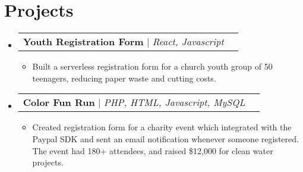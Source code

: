 \documentclass[letterpaper,11pt]{article}
\makeatletter
\newcommand{\resumeItem}[1]{
  \item\small{
    {#1 \vspace{-2pt}}
  }
}
\newcommand{\resumeProjectHeading}[2]{
    \item
    \begin{tabular*}{0.97\textwidth}{l@{\extracolsep{\fill}}r}
      \small#1 & #2 \\
    \end{tabular*}\vspace{-7pt}
}
\newcommand{\resumeSubHeadingListStart}{\begin{itemize}[leftmargin=0.0in, label={}]}
\newcommand{\resumeSubHeadingListEnd}{\end{itemize}}
\newcommand{\resumeItemListStart}{\begin{itemize}}
\newcommand{\resumeItemListEnd}{\end{itemize}\vspace{-10pt}}
\makeatother
\begin{document}
\section{Projects}
    \resumeSubHeadingListStart
        \resumeProjectHeading
          {\textbf{Youth Registration Form} $|$ \emph{React, Javascript}}{}
          \resumeItemListStart[leftmargin=0.15in]
            \resumeItem{ Built a serverless registration form for a church youth group of 50 teenagers, reducing paper waste and cutting costs.}
          \resumeItemListEnd
        \resumeProjectHeading
          {\textbf{Color Fun Run} $|$ \emph{PHP, HTML, Javascript, MySQL}}{}
          \resumeItemListStart[leftmargin=0.15in]
            \resumeItem{ Created registration form for a charity event which integrated with the Paypal SDK and sent an email notification whenever someone registered. The event had 180+ attendees, and raised \$12,000 for clean water projects.}
          \resumeItemListEnd  

        
    \resumeSubHeadingListEnd
\end{document}
